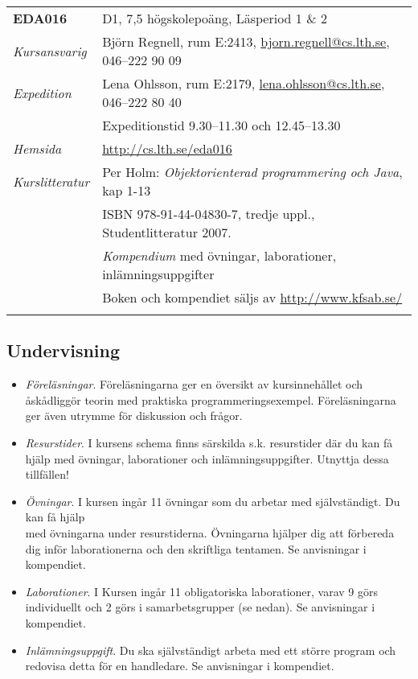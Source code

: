 \begin{longtable}[c]{@{}ll@{}}
\toprule\addlinespace
\textbf{EDA016} & D1, 7,5 högskolepoäng, Läsperiod 1 \& 2
\\\addlinespace
\midrule\endhead
\emph{Kursansvarig} & Björn Regnell, rum E:2413,
\href{mailto:bjorn.regnell@cs.lth.se}{bjorn.regnell@cs.lth.se}, 046--222
90 09
\\\addlinespace
\emph{Expedition} & Lena Ohlsson, rum E:2179,
\href{mailto:lena.ohlsson@cs.lth.se}{lena.ohlsson@cs.lth.se}, 046--222
80 40
\\\addlinespace
& Expeditionstid 9.30--11.30 och 12.45--13.30
\\\addlinespace
\emph{Hemsida} & \url{http://cs.lth.se/eda016}
\\\addlinespace
\emph{Kurslitteratur} & Per Holm: \emph{Objektorienterad programmering
och Java}, kap 1-13
\\\addlinespace
& ISBN 978-91-44-04830-7, tredje uppl., Studentlitteratur 2007.
\\\addlinespace
& \emph{Kompendium} med övningar, laborationer, inlämningsuppgifter
\\\addlinespace
& Boken och kompendiet säljs av \url{http://www.kfsab.se/}
\\\addlinespace
\bottomrule
\end{longtable}

\subsection{Undervisning}\label{undervisning}

\begin{itemize}
\item
  \emph{Föreläsningar}. Föreläsningarna ger en översikt av
  kursinnehållet och åskådliggör teorin med praktiska
  programmeringsexempel. Föreläsningarna ger även utrymme för diskussion
  och frågor.
\item
  \emph{Resurstider}. I kursens schema finns särskilda s.k. resurstider
  där du kan få hjälp med övningar, laborationer och
  inlämningsuppgifter. Utnyttja dessa tillfällen!
\item
  \emph{Övningar}. I kursen ingår 11 övningar som du arbetar med
  självständigt. Du kan få hjälp\\med övningarna under resurstiderna.
  Övningarna hjälper dig att förbereda dig inför laborationerna och den
  skriftliga tentamen. Se anvisningar i kompendiet.
\item
  \emph{Laborationer}. I Kursen ingår 11 obligatoriska laborationer,
  varav 9 görs individuellt och 2 görs i samarbetsgrupper (se nedan). Se
  anvisningar i kompendiet.
\item
  \emph{Inlämningsuppgift}. Du ska självständigt arbeta med ett större
  program och redovisa detta för en handledare. Se anvisningar i
  kompendiet.
\end{itemize}

